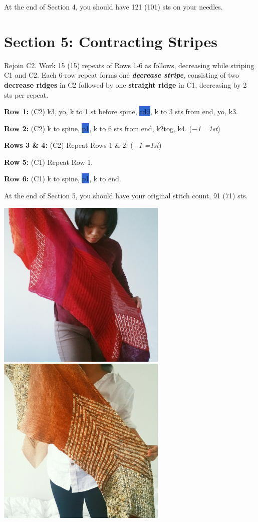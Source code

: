 \documentclass[12pt]{article}
\newcommand{\vocab}[1]{\emph{\textbf{#1}}} %
\newcommand{\rowDir}[1]{\hspace{-2em} \textbf{#1:}} %
\newcommand{\spine}[1]{\colorbox{highlight}{#1}} %
\newcommand{\decrease}[1]{(\emph{$-$#1
	\ifnum#1=1{st}\else{sts}\fi})}
\newenvironment{frdirection}
    {%
	\def\FrameCommand{\fboxrule=\FrameRule\fboxsep=\FrameSep \fbox}
   	\MakeFramed {\advance\hsize-\width \FrameRestore}
    	\addmargin[1.5cm]{0pt}}
    {\endaddmargin
	\endMakeFramed}
\begin{document}
At the end of Section 4, you should have 121 (101) sts on your needles.


\section*{Section 5: Contracting Stripes}
Rejoin C2. Work 15 (15) repeats of Rows 1-6 as follows, decreasing while striping C1 and C2. Each 6-row repeat forms one \vocab{decrease stripe}, consisting of two \textbf{decrease ridges} in C2 followed by one \textbf{straight ridge} in C1, decreasing by 2 sts per repeat.

\begin{frdirection}
\rowDir{Row 1} (C2) k3, yo, k to 1 st before spine, \spine{cdd}, k to 3 sts from end, yo, k3.

\rowDir{Row 2} (C2) k to spine, \spine{p1}, k to 6 sts from end, k2tog, k4. \decrease{1}

\rowDir{Rows 3 \& 4} (C2) Repeat Rows 1 \& 2. \decrease{1}

\rowDir{Row 5} (C1) Repeat Row 1.

\rowDir{Row 6} (C1) k to spine, \spine{p1}, k to end.
\end{frdirection}

At the end of Section 5, you should have your original stitch count, 91 (71) sts.

\vfill
\begin{center}
\includegraphics[height=3.2in]{LW-holdDetail-small} \hfill
\includegraphics[height=3.2in]{FW-holdDetail-small}
\end{center}
\end{document}
